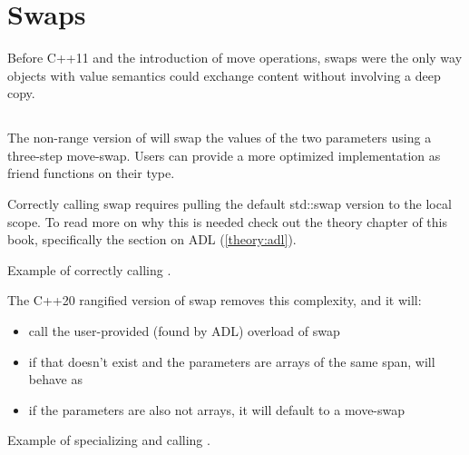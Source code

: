 \section{Swaps}

Before C++11 and the introduction of move operations, swaps were the only way objects with value semantics could exchange content without involving a deep copy.

\subsection{\texorpdfstring{}{\texttt{std::swap}}}

The non-range version of  will swap the values of the two parameters using a three-step move-swap. Users can provide a more optimized implementation as friend functions on their type.


Correctly calling swap requires pulling the default std::swap version to the local scope. To read more on why this is needed check out the theory chapter of this book, specifically the section on ADL (\ref{theory:adl}).

\begin{box-note}
\footnotesize Example of correctly calling .
\tcblower
{}
\end{box-note}
\newpage

The C++20 rangified version of swap removes this complexity, and it will:

\begin{itemize}
    \item call the user-provided (found by ADL) overload of swap
    \item if that doesn't exist and the parameters are arrays of the same span,  will behave as 
    \item if the parameters are also not arrays, it will default to a move-swap
\end{itemize}

\begin{box-note}
\footnotesize Example of specializing and calling .
\tcblower
{}
\end{box-note}

\subsection{\texorpdfstring{}{\texttt{std::iter\_swap}}}

